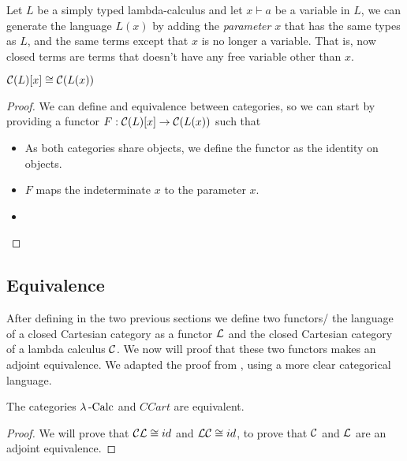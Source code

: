 \begin{definition}
\begin{definition}
  Let $L$ be a simply typed lambda-calculus and let $x\vdash a$ be a variable in $L$, we can generate the language $L(x)$ by adding the \emph{parameter} $x$ that has the same types as $L$, and the same terms except that $x$ is no longer a variable. That is, now closed terms are terms that doesn't have any free variable other than $x$.
\end{definition}



\begin{proposition}
$\mathcal{C}(L)[x] \cong \mathcal{C}(L(x))$
\end{proposition}
\begin{proof}
  We can define and equivalence between categories, so we can start by providing a functor $F: \mathcal{C}(L)[x] \to \mathcal{C}(L(x))$ such that
  \begin{itemize}
  \item As both categories share objects, we define the functor as the identity on objects.
  \item $F$ maps the indeterminate $x$ to the parameter $x$.
  \item 
  \end{itemize}
\end{proof}
\subsection{Equivalence}
After defining in the two previous sections we define two functors/ the language of a closed Cartesian category as a functor $\mathcal{L}$ and the closed Cartesian category of a lambda calculus $\mathcal{C}$. We now will proof that these two functors makes an adjoint equivalence. We adapted the proof from \cite[Theorem 11.3]{lambek1988introduction}, using a more clear categorical language. 


\begin{theorem}The categories $\lambda\operatorname{-Calc}$ and $CCart$ are equivalent. \end{theorem}
\begin{proof}
  We will prove that $\mathcal{C} \mathcal{L} \cong id$ and  $ \mathcal{L}\mathcal{C} \cong id$, to prove that $\mathcal{C}$ and $\mathcal{L}$ are an adjoint equivalence.


\end{proof}
\end{definition}
